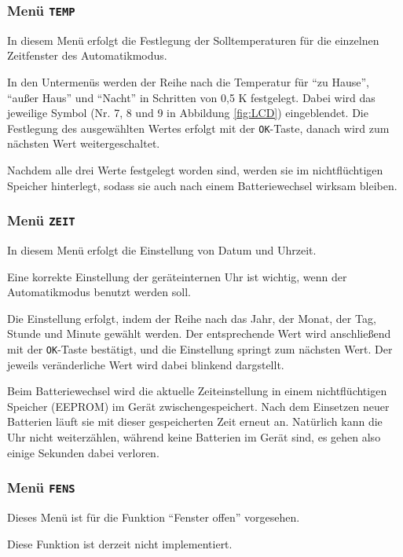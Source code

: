 \documentclass[a5paper,twoside]{article}
\begin{document}
\subsubsection {
  Menü \texttt{TEMP}\label{menu:temp}
}

In diesem Menü erfolgt die Festlegung der Solltemperaturen für die
einzelnen Zeitfenster des Automatikmodus.

In den Untermenüs werden der Reihe nach die Temperatur für "`zu
Hause"', "`außer Haus"' und "`Nacht"' in Schritten von 0,5 K
festgelegt.  Dabei wird das jeweilige Symbol (Nr. 7, 8 und 9
in Abbildung \ref{fig:LCD}) eingeblendet.  Die Festlegung des
ausgewählten Wertes erfolgt mit der \texttt{OK}-Taste, danach
wird zum nächsten Wert weitergeschaltet.

Nachdem alle drei Werte festgelegt worden sind, werden sie im
nichtflüchtigen Speicher hinterlegt, sodass sie auch nach einem
Batteriewechsel wirksam bleiben.

\subsubsection {
  Menü \texttt{ZEIT}\label{menu:zeit}
}

In diesem Menü erfolgt die Einstellung von Datum und Uhrzeit.

Eine korrekte Einstellung der geräteinternen Uhr ist wichtig, wenn
der Automatikmodus benutzt werden soll.

Die Einstellung erfolgt, indem der Reihe nach das Jahr, der Monat,
der Tag, Stunde und Minute gewählt werden.  Der entsprechende Wert
wird anschließend mit der \texttt{OK}-Taste bestätigt, und die
Einstellung springt zum nächsten Wert.  Der jeweils veränderliche
Wert wird dabei blinkend dargstellt.

Beim Batteriewechsel wird die aktuelle Zeiteinstellung in einem
nichtflüchtigen Speicher (EEPROM) im Gerät zwischengespeichert.  Nach
dem Einsetzen neuer Batterien läuft sie mit dieser gespeicherten Zeit
erneut an.  Natürlich kann die Uhr nicht weiterzählen, während keine
Batterien im Gerät sind, es gehen also einige Sekunden dabei
verloren.

\subsubsection {
  Menü \texttt{FENS}
}

Dieses Menü ist für die Funktion "`Fenster offen"' vorgesehen.

Diese Funktion ist derzeit nicht implementiert.
\end{document}
